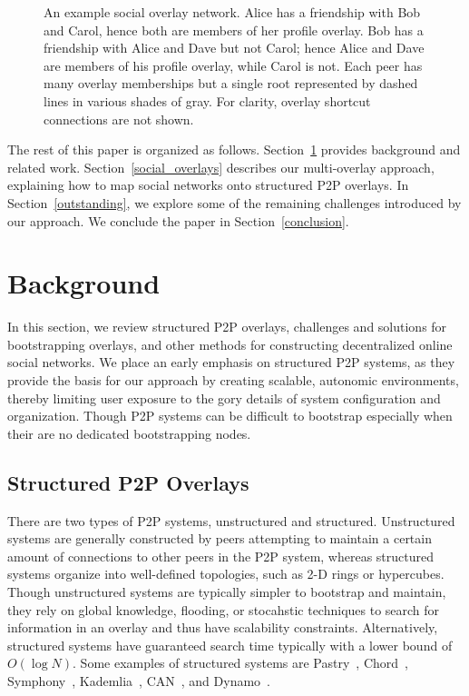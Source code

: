 \documentclass[conference]{IEEEtran}
\begin{document}
\begin{figure}[h]
\centering
{}
\caption{An example social overlay network.  Alice has a friendship with Bob
and Carol, hence both are members of her profile overlay. Bob has a friendship
with Alice and Dave but not Carol; hence Alice and Dave are members of his
profile overlay, while Carol is not.  Each peer has many overlay memberships
but a single root represented by dashed lines in various shades of gray.  For
clarity, overlay shortcut connections are not shown.} \label{fig:system}
\end{figure}

The rest of this paper is organized as follows.  Section~\ref{background}
provides background and related work.  Section~\ref{social_overlays} describes
our multi-overlay approach, explaining how to map social networks onto
structured P2P overlays.  In Section~\ref{outstanding}, we explore some of the
remaining challenges introduced by our approach.  We conclude the paper in
Section~\ref{conclusion}.

\section{Background}
\label{background}

In this section, we review structured P2P overlays, challenges and solutions
for bootstrapping overlays, and other methods for constructing decentralized
online social networks.  We place an early emphasis on structured P2P systems,
as they  provide the basis for our approach by  creating scalable, autonomic
environments, thereby limiting user exposure to the gory details of system
configuration and organization.  Though P2P systems can be difficult to
bootstrap especially when their are no dedicated bootstrapping nodes.

\subsection{Structured P2P Overlays}

There are two types of P2P systems, unstructured and structured.  Unstructured
systems are generally constructed by peers attempting to maintain a certain
amount of connections to other peers in the P2P system, whereas structured
systems organize into well-defined topologies, such as 2-D rings or
hypercubes.  Though unstructured systems are typically simpler to bootstrap
and maintain, they rely on global knowledge, flooding, or stocahstic
techniques to search for information in an overlay and thus have scalability
constraints.  Alternatively, structured systems have guaranteed search time
typically with a lower bound of $O(\log N)$.  Some examples of structured
systems are Pastry~\cite{pastry}, Chord~\cite{chord},
Symphony~\cite{symphony}, Kademlia~\cite{kademlia}, CAN~\cite{can}, and
Dynamo~\cite{dynamo}.
\end{document}

